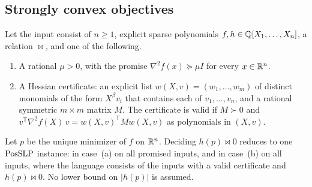 \subsection{Strongly convex objectives}
\label{sec:upper-convex}

\begin{theorem}
\label{thm:exact-upper}
Let the input consist of $n\ge1$, explicit sparse polynomials
$f,h\in\mathbb Q[X_1,\ldots,X_n]$, a relation ${\bowtie}$, and one of the following.
\begin{enumerate}[label=(\alph*)]
\item A rational $\mu>0$, with the promise $\nabla^2f(x)\succeq\mu I$ for
every $x\in\mathbb R^n$.
\item A Hessian certificate: an explicit list $w(X,v)=(w_1,\ldots,w_m)$ of
distinct monomials of the form $X^\beta v_i$ that contains each of
$v_1,\ldots,v_n$, and a rational symmetric $m\times m$ matrix $M$. The
certificate is valid if $M\succ0$ and
$v^{\mathsf T}\nabla^2f(X)\,v=w(X,v)^{\mathsf T}Mw(X,v)$ as polynomials in
$(X,v)$.
\end{enumerate}
Let $p$ be the unique minimizer of $f$ on $\mathbb R^n$. Deciding
$h(p)\bowtie0$ reduces to one $\mathrm{PosSLP}$ instance: in case~(a) on all
promised inputs, and in case~(b) on all inputs, where the language consists of
the inputs with a valid certificate and $h(p)\bowtie0$. No lower bound on
$|h(p)|$ is assumed.
\end{theorem}

